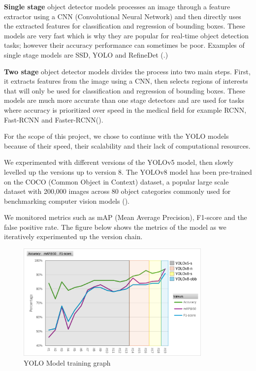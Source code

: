 \newpage{}
\textbf{Single stage} object detector models processes an image through a
feature extractor using a CNN (Convolutional Neural Network) and then directly
uses the extracted features for classification and regression of bounding boxes.
These models are very fast which is why they are popular for real-time object
detection tasks; however their accuracy performance can sometimes be poor.
Examples of single stage models are SSD, YOLO and RefineDet
(\cite{YOLOversionsliterature}.)

\textbf{Two stage} object detector models divides the process into two main
steps. First, it extracts features from the image using a CNN, then selects
regions of interests that will only be used for classification and regression of
bounding boxes. These models are much more accurate than one stage detectors and
are used for tasks where accuracy is prioritized over speed in the medical field
for example RCNN, Fast-RCNN and Faster-RCNN(\cite{singlevstwostagedetectors}).

For the scope of this project, we chose to continue with the YOLO models because
of their speed, their scalability and their lack of computational resources.

We experimented with different versions of the YOLOv5 model, then slowly
levelled up the versions up to version 8.  The YOLOv8 model has been pre-trained
on the COCO (Common Object in Context) dataset, a popular large scale dataset
with 200,000 images across 80 object categories commonly used for benchmarking
computer vision models (\cite{cocodataset}).

We monitored metrics such as mAP (Mean Average Precision), F1-score and the
false positive rate. The figure below shows the metrics of the model as we
iteratively experimented up the version chain.

\begin{figure}[htbp]
  \centering
  \includegraphics[width=0.85\textwidth]{images/YOLO-results.png}
  \caption{YOLO Model training graph}
\end{figure}

